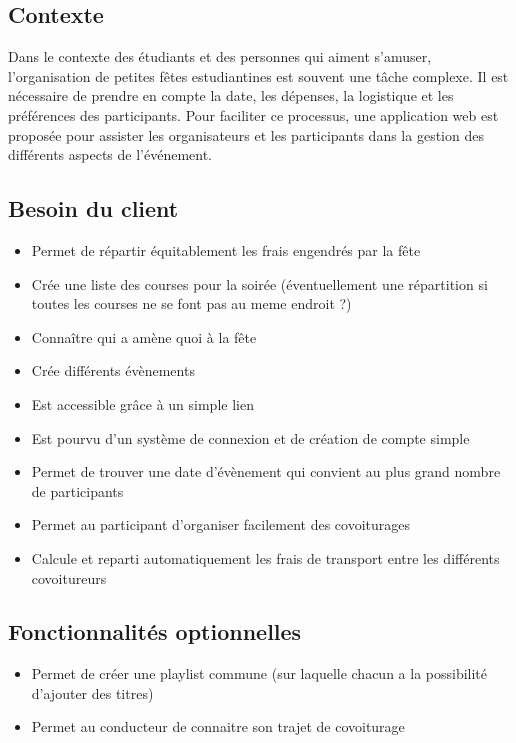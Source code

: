 
\subsection{Contexte}
Dans le contexte des étudiants et des personnes qui aiment s'amuser, l'organisation de petites fêtes estudiantines est souvent une tâche complexe.
Il est nécessaire de prendre en compte la date, les dépenses, la logistique et les préférences des participants.
Pour faciliter ce processus, une application web est proposée pour assister les organisateurs et les participants dans la gestion des différents aspects de l'événement.

\subsection{Besoin du client}\label{subsec:besoin-du-client}
\begin{itemize}
    \item Permet de répartir équitablement les frais engendrés par la fête
    \item Crée une liste des courses pour la soirée (éventuellement une répartition si toutes les courses ne se font pas au meme endroit ?)
    \item Connaître qui a amène quoi à la fête
    \item Crée différents évènements
    \item Est accessible grâce à un simple lien
    \item Est pourvu d'un système de connexion et de création de compte simple
    \item Permet de trouver une date d’évènement qui convient au plus grand nombre de participants
    \item Permet au participant d'organiser facilement des covoiturages
    \item Calcule et reparti automatiquement les frais de transport entre les différents covoitureurs
\end{itemize}
\subsection{Fonctionnalités optionnelles}\label{subsec:fonctionnalites-optionnelles}
\begin{itemize}
    \item Permet de créer une playlist commune (sur laquelle chacun a la possibilité d'ajouter des titres)
    \item Permet au conducteur de connaitre son trajet de covoiturage
\end{itemize}

